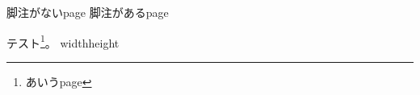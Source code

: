 \documentclass{tarticle}
\begin{document}
脚注がないpage\clearpage
脚注があるpage\par テスト\footnote{あいうpage}。\clearpage
\noindent\vrule width\textwidth height\textheight
\end{document}
